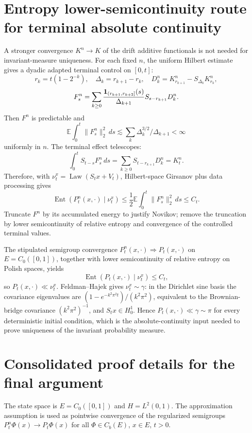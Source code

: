 \documentclass[12pt]{article}
\newcommand{\E}{\mathbb E}
\newcommand{\Law}{\operatorname{Law}}
\newcommand{\Ent}{\operatorname{Ent}}
\begin{document}
\section*{Entropy lower-semicontinuity route for terminal absolute continuity}

A stronger convergence \(K^n\to K\) of the drift additive functionals is not
needed for invariant-measure uniqueness.  For each fixed \(n\), the uniform
Hilbert estimate gives a dyadic adapted terminal control on \([0,t]\):
\[
 r_k=t(1-2^{-k}),\quad \Delta_k=r_{k+1}-r_k,\quad
 D_k^n=K^n_{r_{k+1}}-S_{\Delta_k}K^n_{r_k},
\]
\[
 F_s^n=\sum_{k\ge0}\frac{{\bf1}_{(r_{k+1},r_{k+2}]}(s)}
             {\Delta_{k+1}}S_{s-r_{k+1}}D_k^n .
\]
Then \(F^n\) is predictable and
\[
 \E\int_0^t\|F_s^n\|_2^2\,ds
 \lesssim \sum_k\Delta_k^{3/2}/\Delta_{k+1}<\infty
\]
uniformly in \(n\).  The terminal effect telescopes:
\[
 \int_0^tS_{t-s}F_s^n\,ds
 =\sum_{k\ge0}S_{t-r_{k+1}}D_k^n
 =K_t^n .
\]
Therefore, with \(\nu_t^x=\Law(S_tx+V_t)\), Hilbert-space Girsanov plus
data processing gives
\[
 \Ent(P_t^n(x,\cdot)\mid\nu_t^x)
 \le \frac12\E\int_0^t\|F_s^n\|_2^2\,ds\le C_t .
\]
Truncate \(F^n\) by its accumulated energy to justify Novikov; remove the
truncation by lower semicontinuity of relative entropy and convergence of the
controlled terminal values.

The stipulated semigroup convergence
\(P_t^n(x,\cdot)\Rightarrow P_t(x,\cdot)\) on \(E=C_0([0,1])\), together with
lower semicontinuity of relative entropy on Polish spaces, yields
\[
 \Ent(P_t(x,\cdot)\mid\nu_t^x)\le C_t,
\]
so \(P_t(x,\cdot)\ll\nu_t^x\).  Feldman--Hajek gives
\(\nu_t^x\sim\gamma\): in the Dirichlet sine basis the covariance eigenvalues
are \((1-e^{-k^2\pi^2t})/(k^2\pi^2)\), equivalent to the Brownian-bridge
covariance \((k^2\pi^2)^{-1}\), and \(S_tx\in H_0^1\).  Hence
\(P_t(x,\cdot)\ll\gamma\sim\pi\) for every deterministic initial condition,
which is the absolute-continuity input needed to prove uniqueness of the
invariant probability measure.



\section*{Consolidated proof details for the final argument}

The state space is $E=C_0([0,1])$ and $H=L^2(0,1)$.  The approximation
assumption is used as pointwise convergence of the regularized semigroups
$P_t^n\Phi(x)\to P_t\Phi(x)$ for all $\Phi\in C_b(E)$, $x\in E$, $t>0$.
\end{document}
